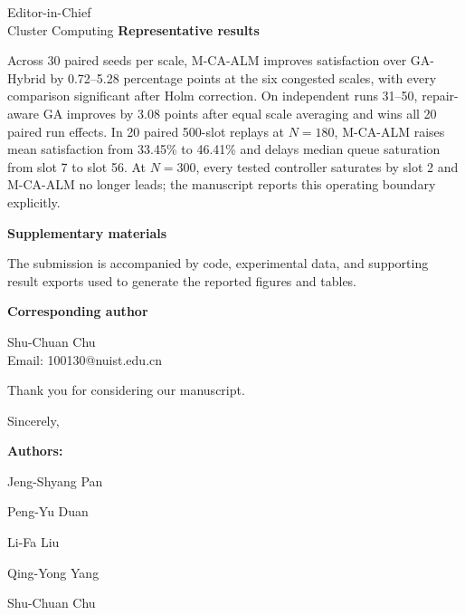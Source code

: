 \documentclass[11pt]{letter}
\makeatletter
\def\correspondingAuthor{Shu-Chuan Chu}
\def\correspondingEmail{100130@nuist.edu.cn}
\makeatother
\begin{document}
\begin{letter}{
    Editor-in-Chief \\
    Cluster Computing
}
\medskip
\textbf{Representative results}

\medskip

Across 30 paired seeds per scale, M-CA-ALM improves satisfaction over GA-Hybrid by 0.72--5.28 percentage points at the six congested scales, with every comparison significant after Holm correction. On independent runs 31--50, repair-aware GA improves by 3.08 points after equal scale averaging and wins all 20 paired run effects. In 20 paired 500-slot replays at $N=180$, M-CA-ALM raises mean satisfaction from 33.45\% to 46.41\% and delays median queue saturation from slot 7 to slot 56. At $N=300$, every tested controller saturates by slot 2 and M-CA-ALM no longer leads; the manuscript reports this operating boundary explicitly.

\medskip
\textbf{Supplementary materials}

\medskip

The submission is accompanied by code, experimental data, and supporting result exports used to generate the reported figures and tables.

\medskip
\textbf{Corresponding author}

\medskip

\correspondingAuthor \\
Email: \correspondingEmail

Thank you for considering our manuscript.

\closing{Sincerely,}

\medskip

\textbf{Authors:}

Jeng-Shyang Pan

Peng-Yu Duan

Li-Fa Liu

Qing-Yong Yang

Shu-Chuan Chu

\end{letter}
\end{document}

